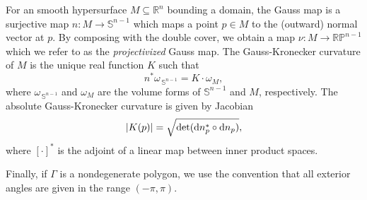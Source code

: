 For an smooth hypersurface $M \subseteq \mathbb{R}^n$ bounding a domain, the Gauss map is a surjective map $n \colon M \to \mathbb{S}^{n-1}$ which maps a point $p \in M$ to the (outward) normal vector at $p$. By composing with the double cover, we obtain a map $\nu \colon M \to \mathbb{RP}^{n-1}$ which we refer to as the \textit{projectivized} Gauss map. The Gauss-Kronecker curvature of $M$ is the unique real function $K$ such that 
\begin{equation}
  n^*\omega_{\,\mathbb{S}^{n-1}} = K \cdot \omega_M,
\end{equation}
where $\omega_{\,\mathbb{S}^{n-1}}$ and $\omega_M$ are the volume forms of $\mathbb{S}^{n-1}$ and $M$, respectively. The absolute Gauss-Kronecker curvature is given by Jacobian
\begin{equation}
  |K(p)| = \sqrt{\det({\rm d} n_p^{*} \circ {\rm d} n_p)},
\end{equation}
where $[\cdot]^*$ is the adjoint of a linear map between inner product spaces.

Finally, if $\Gamma$ is a nondegenerate polygon, we use the convention that all exterior angles are given in the range $(-\pi, \pi)$.
